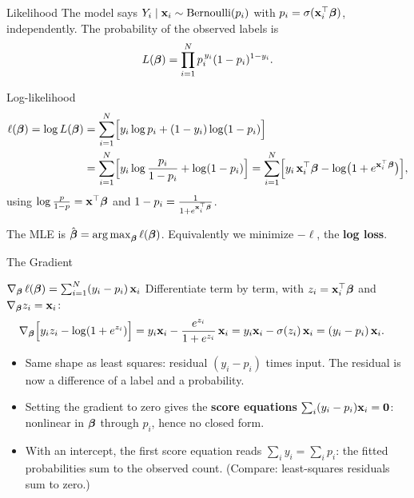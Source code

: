 \documentclass[11pt,aspectratio=169]{beamer}
\begin{document}
\begin{frame}{Likelihood}\small
The model says $Y_i\mid\mathbf{x}_i\sim\text{Bernoulli}(p_i)$ with $p_i=\sigma(\mathbf{x}_i^{\top}\boldsymbol{\beta})$, independently. The
probability of the observed labels is
\[
L(\boldsymbol{\beta})=\prod_{i=1}^N p_i^{\,y_i}(1-p_i)^{1-y_i}.
\]
\begin{derivation}{Log-likelihood}
\begin{align*}
\ell(\boldsymbol{\beta})=\log L(\boldsymbol{\beta})&=\sum_{i=1}^N\Bigl[y_i\log p_i+(1-y_i)\log(1-p_i)\Bigr]\\
&=\sum_{i=1}^N\Bigl[y_i\log\frac{p_i}{1-p_i}+\log(1-p_i)\Bigr]
=\sum_{i=1}^N\Bigl[y_i\,\mathbf{x}_i^{\top}\boldsymbol{\beta}-\log\bigl(1+e^{\mathbf{x}_i^{\top}\boldsymbol{\beta}}\bigr)\Bigr],
\end{align*}
using $\log\frac{p}{1-p}=\mathbf{x}^{\top}\boldsymbol{\beta}$ and $1-p_i=\frac1{1+e^{\mathbf{x}_i^{\top}\boldsymbol{\beta}}}$.
\end{derivation}
The MLE is $\hat{\boldsymbol{\beta}}=\operatorname*{arg\,max}_{\boldsymbol{\beta}}\ell(\boldsymbol{\beta})$. Equivalently we minimize $-\ell$, the \textbf{log loss}.
\end{frame}

\begin{frame}{The Gradient}
\begin{derivation}{$\nabla_{\boldsymbol{\beta}}\,\ell(\boldsymbol{\beta})=\sum_{i=1}^N(y_i-p_i)\,\mathbf{x}_i$}
Differentiate term by term, with $z_i=\mathbf{x}_i^{\top}\boldsymbol{\beta}$ and $\nabla_{\boldsymbol{\beta}} z_i=\mathbf{x}_i$:
\begin{align*}
\nabla_{\boldsymbol{\beta}}\Bigl[y_iz_i-\log(1+e^{z_i})\Bigr]
&=y_i\mathbf{x}_i-\frac{e^{z_i}}{1+e^{z_i}}\,\mathbf{x}_i
=y_i\mathbf{x}_i-\sigma(z_i)\,\mathbf{x}_i=(y_i-p_i)\,\mathbf{x}_i .
\end{align*}
\end{derivation}
\begin{itemize}
  \item Same shape as least squares: residual $(y_i-p_i)$ times input. The residual is now a difference
        of a label and a probability.
  \item Setting the gradient to zero gives the \textbf{score equations} $\sum_i(y_i-p_i)\mathbf{x}_i=\mathbf{0}$:
        nonlinear in $\boldsymbol{\beta}$ through $p_i$, hence no closed form.
  \item With an intercept, the first score equation reads $\sum_iy_i=\sum_ip_i$: the fitted probabilities
        sum to the observed count. (Compare: least-squares residuals sum to zero.)
\end{itemize}
\end{frame}
\end{document}

